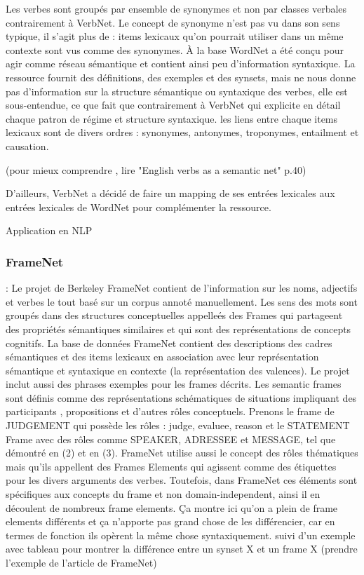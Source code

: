 Les verbes sont groupés par ensemble de synonymes et non par classes verbales contrairement à VerbNet. Le concept de synonyme n'est pas vu dans son sens typique, il s'agit plus de : items lexicaux qu'on pourrait utiliser dans un même contexte sont vus comme des synonymes. À la base WordNet a été conçu pour agir comme réseau sémantique et contient ainsi peu d'information syntaxique. La ressource fournit des définitions, des exemples et des synsets, mais ne nous donne pas d'information sur la structure sémantique ou syntaxique des verbes, elle est sous-entendue, ce que fait que contrairement à VerbNet qui explicite en détail chaque patron de régime et structure syntaxique. les liens entre chaque items lexicaux sont de divers ordres : synonymes, antonymes, troponymes, entailment et causation.

(pour mieux comprendre , lire "English verbs as a semantic net" p.40)

D'ailleurs, VerbNet a décidé de faire un mapping de ses entrées lexicales aux entrées lexicales de WordNet pour complémenter la ressource. 

Application en NLP

\subsubsection{FrameNet} : Le projet de Berkeley FrameNet contient de l'information sur les noms, adjectifs et verbes le tout basé sur un corpus annoté manuellement. Les sens des mots sont groupés dans des structures conceptuelles appelleés des Frames qui partageent des propriétés sémantiques similaires et qui sont des représentations de concepts cognitifs. La base de données FrameNet contient des descriptions des cadres sémantiques et des items lexicaux en association avec leur représentation sémantique et syntaxique en contexte (la représentation des valences). Le projet inclut aussi des phrases exemples pour les frames décrits. Les semantic frames sont définis comme des représentations schématiques de situations impliquant des participants , propositions et d'autres rôles conceptuels. Prenons le frame de JUDGEMENT qui possède les rôles : judge, evaluee, reason et le STATEMENT Frame avec des rôles comme SPEAKER, ADRESSEE et MESSAGE, tel que démontré en (2) et en (3). FrameNet utilise aussi le concept des rôles thématiques mais qu'ils appellent des Frames Elements qui agissent comme des étiquettes pour les divers arguments des verbes. Toutefois, dans FrameNet ces éléments sont spécifiques aux concepts du frame et non domain-independent, ainsi il en découlent de nombreux frame elements. Ça montre ici qu'on a plein de frame elements différents et ça n'apporte pas grand chose de les différencier, car en termes de fonction ils opèrent la même chose syntaxiquement.
suivi d'un exemple avec tableau pour montrer la différence entre un synset X et un frame X (prendre l'exemple de l'article de FrameNet)

